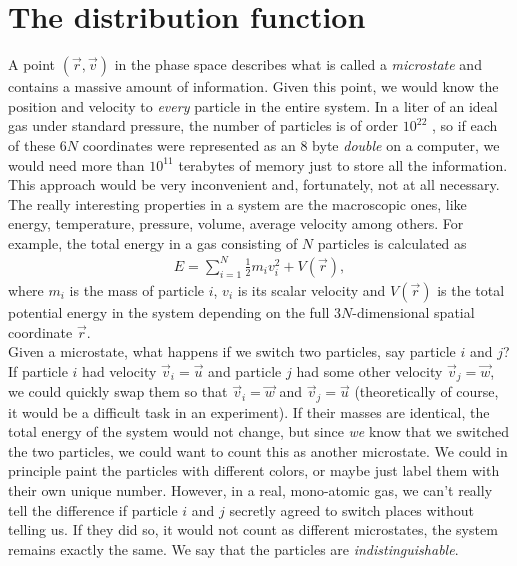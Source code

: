 \section{The distribution function}
\label{sec:kinetic_theory_distribution_function}
A point $(\vec r, \vec v)$ in the phase space describes what is called a \textit{microstate} and contains a massive amount of information. Given this point, we would know the position and velocity to \textit{every} particle in the entire system. In a liter of an ideal gas under standard pressure, the number of particles is of order $10^{22}$ \cite{garcia2000numerical}, so if each of these $6N$ coordinates were represented as an 8 byte \textit{double} on a computer, we would need more than $10^{11}$ terabytes of memory just to store all the information. This approach would be very inconvenient and, fortunately, not at all necessary. The really interesting properties in a system are the macroscopic ones, like energy, temperature, pressure, volume, average velocity among others. For example, the total energy in a gas consisting of $N$ particles is calculated as
\begin{align*}
	E = \sum_{i=1}^N \frac{1}{2} m_i v_i^2 + V(\vec r),
\end{align*}
where $m_i$ is the mass of particle $i$, $v_i$ is its scalar velocity and $V(\vec r)$ is the total potential energy in the system depending on the full $3N$-dimensional spatial coordinate $\vec r$.\\
Given a microstate, what happens if we switch two particles, say particle $i$ and $j$? If particle $i$ had velocity $\vec v_i = \vec u$ and particle $j$ had some other velocity $\vec v_j = \vec w$, we could quickly swap them so that $\vec v_i = \vec w$ and $\vec v_j = \vec u$ (theoretically of course, it would be a difficult task in an experiment). If their masses are identical, the total energy of the system would not change, but since \textit{we} know that we switched the two particles, we could want to count this as another microstate. We could in principle paint the particles with different colors, or maybe just label them with their own unique number. However, in a real, mono-atomic gas, we can't really tell the difference if particle $i$ and $j$ secretly agreed to switch places without telling us. If they did so, it would not count as different microstates, the system remains exactly the same. We say that the particles are \textit{indistinguishable}.

